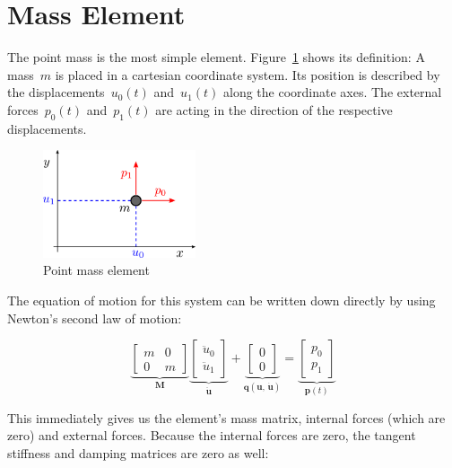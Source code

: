 \newpage
\section{Mass Element}

The point mass is the most simple element.
Figure~\ref{fig:elements:point-mass} shows its definition: A mass~$m$ is placed in a cartesian coordinate system. Its position is described by the displacements~$u_0(t)$ and~$u_1(t)$ along the coordinate axes.
The external forces~$p_0(t)$ and~$p_1(t)$ are acting in the direction of the respective displacements.

\begin{figure}[h]
\centering
\includegraphics[width=0.4\textwidth]{figures/elements/mass-element}
\caption{Point mass element}
\label{fig:elements:point-mass}
\end{figure}

The equation of motion for this system can be written down directly by using Newton's second law of motion:

\begin{equation}
\underbrace{
\begin{bmatrix}
m & 0\\
0 & m
\end{bmatrix}
}_{\boldsymbol{M}}
\underbrace{
\begin{bmatrix}
\ddot{u}_0\\
\ddot{u}_1
\end{bmatrix}
}_{\boldsymbol{\ddot{u}}}
+
\underbrace{
\begin{bmatrix}
0\\
0
\end{bmatrix}
}_{\boldsymbol{q}(\boldsymbol{u},\,\dot{\boldsymbol{u}})}
=
\underbrace{
\begin{bmatrix}
p_0\\
p_1
\end{bmatrix}
}_{\boldsymbol{p}(t)}
\end{equation}

This immediately gives us the element's mass matrix, internal forces (which are zero) and external forces.
Because the internal forces are zero, the tangent stiffness and damping matrices are zero as well:

